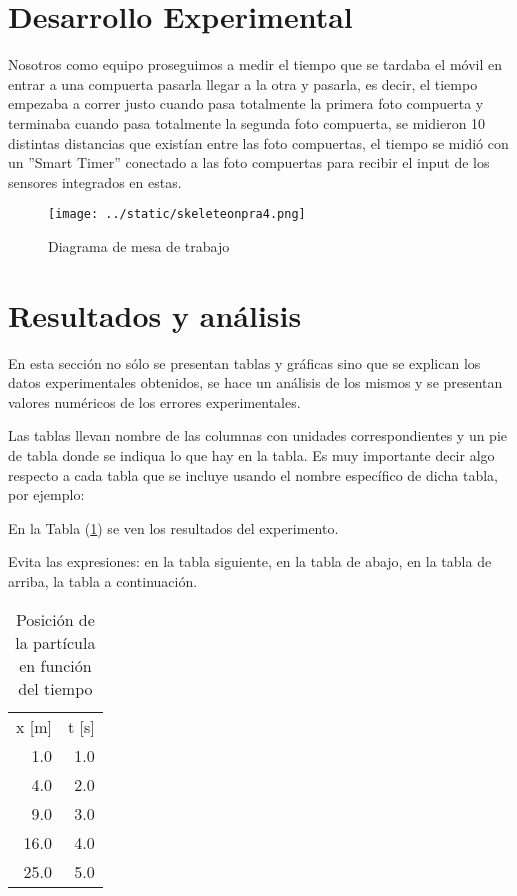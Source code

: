 \documentclass{article}
\begin{document}
\begin{multicols}{2}
\section*{Desarrollo Experimental}\label{Desarrollo experimental}				%

Nosotros como equipo proseguimos a medir el tiempo que se tardaba el móvil en entrar a una compuerta pasarla llegar a la otra y pasarla, es decir, el tiempo empezaba a correr justo cuando pasa totalmente la primera foto compuerta y terminaba cuando pasa totalmente la segunda foto compuerta, se midieron 10 distintas distancias que existían entre las foto compuertas, el tiempo se midió con un ”Smart Timer” conectado a las foto compuertas para recibir el input de los sensores integrados en estas.

\begin{figure}[H]
	\centering
	\texttt{[image: ../static/skeleteonpra4.png]}
	\caption{Diagrama de mesa de trabajo}
	\label{fig:1}
\end{figure}

\section*{Resultados y análisis}\label{Resultados}			%

En esta sección no sólo se presentan tablas y gráficas sino que se explican los datos experimentales obtenidos, se hace un análisis de los mismos y se presentan valores numéricos de los errores experimentales. 

Las tablas llevan nombre de las columnas con unidades correspondientes y un pie de tabla donde se indiqua lo que hay en la tabla. Es muy importante decir algo respecto a cada tabla que se incluye usando el nombre específico de dicha tabla, por ejemplo:

En la Tabla (\ref{Tabla:1}) se ven los resultados del experimento.

Evita las expresiones: en la tabla siguiente, en la tabla de abajo, en la tabla de arriba, la tabla a continuación.
%
\begin{table}[H]
	\centering
	\begin{tabular}{ | r | r | }
	\hline
		x [m]		&	t [s] 			\\%
		1.0		&	1.0			\\
		4.0		&	2.0			\\
		9.0		&	3.0			\\
		16.0		&	4.0			\\
		25.0		&	5.0			\\
	\hline
	\end{tabular}
	\caption{Posici\'on de la partícula en funci\'on del tiempo}
	\label{Tabla:1}
\end{table}


\end{multicols}
\end{document}
